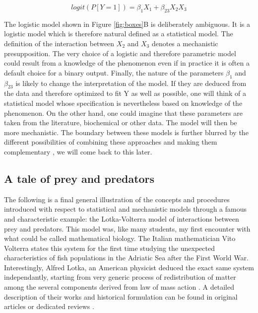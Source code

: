 \documentclass[a4paper,12pt,twoside,onecolumn,openright,final,oldfontcommands]{memoir}
\begin{document}
\[logit(P[Y=1])=\beta_1X_1 + \beta_{23}X_2X_3\]

The logistic model shown in Figure \ref{fig:boxes}B is deliberately
ambiguous. It is a logistic model which is therefore natural defined as
a statistical model. The definition of the interaction between \(X_2\)
and \(X_3\) denotes a mechanistic presupposition. The very choice of a
logistic and therefore parametric model could result from a knowledge of
the phenomenon even if in practice it is often a default choice for a
binary output. Finally, the nature of the parameters \(\beta_{1}\) and
\(\beta_{23}\) is likely to change the interpretation of the model. If
they are deduced from the data and therefore optimized to fit Y as well
as possible, one will think of a statistical model whose specification
is nevertheless based on knowledge of the phenomenon. On the other hand,
one could imagine that these parameters are taken from the literature,
biochemical or other data. The model will then be more mechanistic. The
boundary between these models is further blurred by the different
possibilities of combining these approaches and making them
complementary \citep{baker2018mechanistic, salvucci2019machine}, we will
come back to this later.

\subsection{A tale of prey and predators}\label{lotkasection}

The following is a final general illustration of the concepts and
procedures introduced with respect to statistical and mechanistic models
through a famous and characteristic example: the Lotka-Volterra model of
interactions between prey and predators. This model was, like many
students, my first encounter with what could be called mathematical
biology. The Italian mathematician Vito Volterra states this system for
the first time studying the unexpected characteristics of fish
populations in the Adriatic Sea after the First World War.
Interestingly, Alfred Lotka, an American physicist deduced the exact
same system independantly, starting from very generic process of
redistribution of matter among the several components derived from law
of mass action \citep{knuuttila2017modelling}. A detailed description of
their works and historical formulation can be found in original articles
\citep{lotka1925principles, volterra1926fluctuations} or dedicated
reviews \citep{knuuttila2017modelling}.
\end{document}
